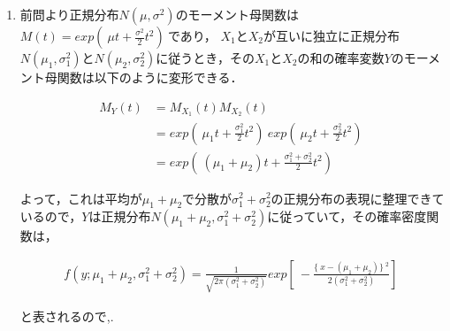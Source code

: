 \documentclass[a4paper,10pt]{jarticle}
\begin{document}
\begin{enumerate}
\item  前問より正規分布$N(\mu,\sigma^2)$のモーメント母関数は$M(t) = exp\left(\ \mu t+ \frac{\sigma^2}{2} t^2\right)\ $であり， $X_1$と$X_2$が互いに独立に正規分布$N(\mu_1,\sigma_1^2)$と$N(\mu_2,\sigma_2^2)$に従うとき，その$X_1$と$X_2$の和の確率変数$Y$のモーメント母関数は以下のように変形できる．

\begin{equation}
\label{equ10}
\begin{split}
M_Y(t) &= M_{X_1}(t)M_{X_2}(t) \\
			 &= exp\left(\ \mu_1 t+ \frac{\sigma_1^2}{2} t^2\right)\ exp\left(\ \mu_2 t+ \frac{\sigma_2^2}{2} t^2\right)\ \\
			 &= exp\left(\ (\mu_1+\mu_2)t+ \frac{\sigma_1^2 + \sigma_2^2}{2} t^2\right)\
\end{split}
\end{equation}

よって，これは平均が$\mu_1+\mu_2$で分散が$\sigma_1^2 + \sigma_2^2$の正規分布の表現に整理できているので，$Y$は正規分布$N(\mu_1+\mu_2,\sigma_1^2 + \sigma_2^2)$に従っていて，その確率密度関数は，

\begin{equation}
\label{equ11}
\begin{split}
f(y;\mu_1+\mu_2,\sigma_1^2 + \sigma_2^2) = \frac{1}{\sqrt{2\pi(\sigma_1^2 + \sigma_2^2)}} exp\left[\ -\frac{ \{\ x-(\mu_1+\mu_2) \}\ ^2}{2(\sigma_1^2 + \sigma_2^2)}\right]\
\end{split}
\end{equation}

と表されるので,.

	\end{enumerate}
	\vspace{3mm}

\end{document}
